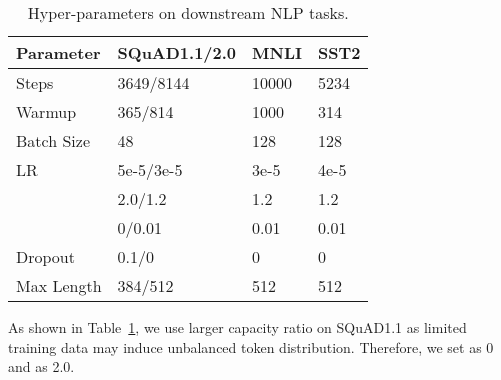 \documentclass[letterpaper]{article} \usepackage{aaai22}  \usepackage{times}  \usepackage{helvet}  \usepackage{courier}  \usepackage[hyphens]{url}  \usepackage{graphicx} \urlstyle{rm} \def\UrlFont{\rm}  \usepackage{natbib}  \usepackage{caption} \DeclareCaptionStyle{ruled}{labelfont=normalfont,labelsep=colon,strut=off} \frenchspacing  \setlength{\pdfpagewidth}{8.5in}  \setlength{\pdfpageheight}{11in}  \usepackage{algorithm}
\begin{document}
\begin{table}[ht]
\centering
\caption{Hyper-parameters on downstream NLP tasks.}
\label{tbl-hyper-parameter-nlp-pretrain}
\begin{tabular}{l|l l l}
\toprule
Parameter                  & SQuAD1.1/2.0 & MNLI & SST2  \\ \midrule
Steps                     & 3649/8144 & 10000 & 5234     \\
Warmup              & 365/814   & 1000 & 314     \\
Batch Size                & 48 & 128 & 128     \\
LR             & 5e-5/3e-5 & 3e-5 & 4e-5  \\
              & 2.0/1.2  & 1.2 & 1.2 \\
                   & 0/0.01  & 0.01 & 0.01  \\ 
Dropout           & 0.1/0   & 0  & 0   \\
Max Length               & 384/512  & 512 & 512  \\
\bottomrule
\end{tabular}
\end{table}

As shown in Table~\ref{tbl-hyper-parameter-nlp-pretrain}, we use larger capacity ratio  on SQuAD1.1 as limited training data may induce unbalanced token distribution. Therefore, we set  as 0 and  as 2.0. 
\end{document}
